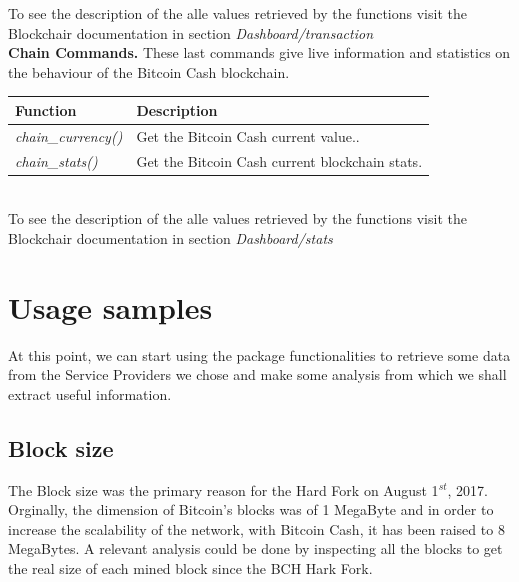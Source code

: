 To see the description of the alle values retrieved by the functions visit the Blockchair 
documentation\cite{blockchair} in section \textit{Dashboard/transaction}\medskip \\
\textbf{Chain Commands.} These last commands give live information and statistics on the behaviour of the Bitcoin Cash 
blockchain.
\begin{table}[!ht]
    \centering
    \begin{tabular}{||p{6.2cm}|p{6cm}||}
    \hline
    \textbf{Function}                          & \textbf{Description}                                                  \\ \hline
    \textit{chain\_currency()}                           & Get the Bitcoin Cash current value..                          \\ \hline
    \textit{chain\_stats()}                              & Get the Bitcoin Cash current blockchain stats.              \\ \hline
   \end{tabular}
    \end{table}\\
    To see the description of the alle values retrieved by the functions visit the Blockchair documentation\cite{blockchair} in section \textit{Dashboard/stats}


\section{Usage samples}
\label{sec:sample}
At this point, we can start using the package functionalities to retrieve some data 
from the Service Providers we chose and make some analysis from which we shall
extract useful information.

\subsection{Block size}
The Block size was the primary reason for the Hard Fork on August 1$^{st}$, 2017. Orginally,
the dimension of Bitcoin's blocks was of 1 MegaByte and in order to increase the 
scalability of the network, with Bitcoin Cash, it has been raised to 8 MegaBytes.
A relevant analysis could be done by inspecting all the blocks to 
get the real size of each mined block since the BCH Hark Fork.

